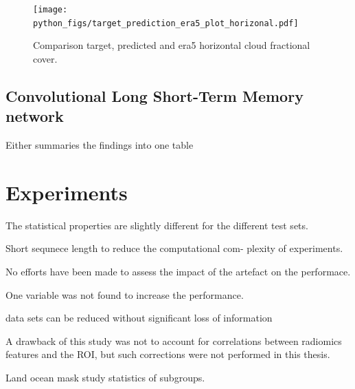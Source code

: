 \begin{figure}[ht]
    \centering
    \texttt{[image: python\_figs/target\_prediction\_era5\_plot\_horizonal.pdf]}
    \caption{Comparison target, predicted and era5 horizontal cloud fractional cover.}
    \label{fig:target_predict_era5_vertical}
\end{figure}

\subsection{Convolutional Long Short-Term Memory network}
Either summaries the findings into one table 


\section{Experiments}



The statistical properties are slightly different for the different test sets.  

Short sequnece length to reduce the computational com-
plexity of experiments. 

No efforts have been made to assess the impact of the artefact on the performace.

One variable was not found to increase the performance.


data sets can be reduced without significant loss of information

A drawback of this study was not to account for correlations between radiomics features and the ROI, but such corrections were
not performed in this thesis.

Land ocean mask study statistics of subgroups.



